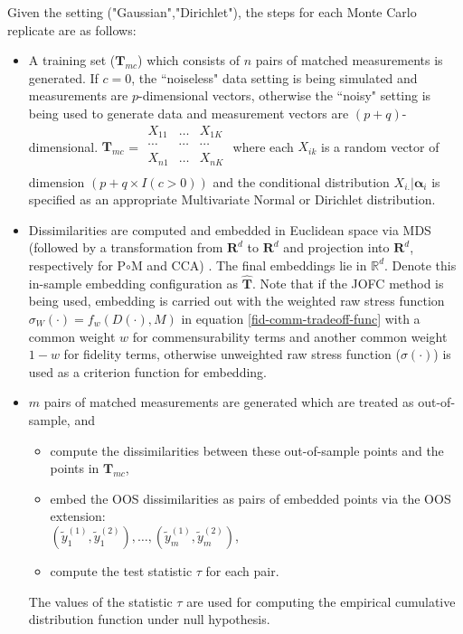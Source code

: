 \documentclass[12pt,oneside,final]{thesis}\usepackage[]{graphicx}\usepackage[]{color}
\begin{document}
Given the setting ("Gaussian","Dirichlet"),   the steps for each Monte Carlo replicate are as follows:
\begin{itemize}
\item A training set ($\mathbf{T}_{mc}$) which consists of  $n$ pairs of matched measurements is generated.  If $c=0$, the ``noiseless" data setting is being simulated and measurements are $p$-dimensional vectors, otherwise  the ``noisy" setting is being used to generate data and measurement vectors are $(p+q)$-dimensional. $ \mathbf{T}_{mc}$ = 
$\begin{array}{ccc}
        X_{11} & \ldots & X_{1K} \\
        \cdots & \cdots      & \cdots   \\ 
        X_{n1} & \ldots     & X_{nK} \\
    \end{array}
$
 where each $X_{ik}$ is a random vector of dimension $(p+q \times I(c>0))$ and the conditional distribution  $X_{i.}|\bm{\alpha}_i  $ is specified as an appropriate Multivariate Normal or Dirichlet distribution.
\item Dissimilarities are computed and embedded in  Euclidean space  via MDS (followed by a transformation from  $\mathbf{R}^d$ to  $\mathbf{R}^d$ and  projection into $\mathbf{R}^d$, respectively  for P$\circ$M and CCA) . The final embeddings lie in $\mathbb{R}^d$.   Denote this in-sample embedding configuration as   $\hat{\mathbf{T}}$. Note that  if the JOFC method is being used, embedding is carried out with the weighted raw stress function $\sigma_{W}(\cdot)=f_{w}(D(\cdot),M)$ in equation \eqref{fid-comm-tradeoff-func} with a common weight $w$ for commensurability terms and another common weight $1-w$ for fidelity terms, otherwise unweighted raw stress function ($\sigma(\cdot)$) is used as a criterion function for embedding.

\item  $m$ pairs of matched   measurements are generated which are treated as out-of-sample, and 
\begin{itemize}
\item compute the dissimilarities  %
 between these out-of-sample  points and the points in ${\mathbf{T}_{mc}}$,  
\item  embed the OOS dissimilarities as pairs of embedded points via the OOS extension:\\
 $(\tilde{y}_1^{(1)},\tilde{y}_1^{(2)}),\ldots, (\tilde{y}_m^{(1)},\tilde{y}_m^{(2)})$, 
\item compute the test statistic $\tau$ for each pair.%
\end{itemize}
 The values of the statistic $\tau$ are used for computing  the empirical cumulative distribution function under null hypothesis. 


\end{itemize}
\end{document}
